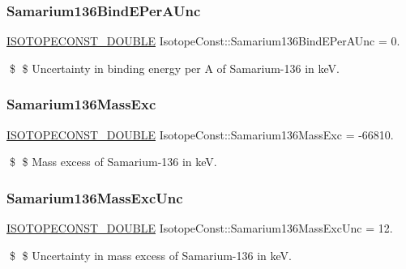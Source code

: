 \subsubsection{\texorpdfstring{Samarium136\+Bind\+E\+Per\+A\+Unc}{Samarium136BindEPerAUnc}}
{\footnotesize\ttfamily \mbox{\hyperlink{group___isotope_const-_macros_ga8f45a7272ce02c0b4c65c44636ed719a}{I\+S\+O\+T\+O\+P\+E\+C\+O\+N\+S\+T\+\_\+\+D\+O\+U\+B\+LE}} Isotope\+Const\+::\+Samarium136\+Bind\+E\+Per\+A\+Unc = 0.}

\$ \$ Uncertainty in binding energy per A of Samarium-\/136 in keV. \mbox{\label{group___isotope_const-_samarium-_sm136_ga6e7da69dabb2d2c4f67bdc268581baff}} 
\subsubsection{\texorpdfstring{Samarium136\+Mass\+Exc}{Samarium136MassExc}}
{\footnotesize\ttfamily \mbox{\hyperlink{group___isotope_const-_macros_ga8f45a7272ce02c0b4c65c44636ed719a}{I\+S\+O\+T\+O\+P\+E\+C\+O\+N\+S\+T\+\_\+\+D\+O\+U\+B\+LE}} Isotope\+Const\+::\+Samarium136\+Mass\+Exc = -\/66810.}

\$ \$ Mass excess of Samarium-\/136 in keV. \mbox{\label{group___isotope_const-_samarium-_sm136_gaef691157fbeeb8e89a02aadaa1ab5154}} 
\subsubsection{\texorpdfstring{Samarium136\+Mass\+Exc\+Unc}{Samarium136MassExcUnc}}
{\footnotesize\ttfamily \mbox{\hyperlink{group___isotope_const-_macros_ga8f45a7272ce02c0b4c65c44636ed719a}{I\+S\+O\+T\+O\+P\+E\+C\+O\+N\+S\+T\+\_\+\+D\+O\+U\+B\+LE}} Isotope\+Const\+::\+Samarium136\+Mass\+Exc\+Unc = 12.}

\$ \$ Uncertainty in mass excess of Samarium-\/136 in keV. \mbox{\label{group___isotope_const-_samarium-_sm136_gac0788c73519d247a5f0e4c8426dac060}} 
